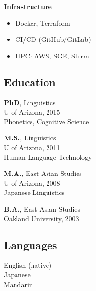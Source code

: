 \documentclass{article}
\begin{document}
\begin{minipage}[t]{0.28\textwidth}
\vspace{0.3em}
\textbf{Infrastructure}
\begin{itemize}[leftmargin=1em, itemsep=0pt, topsep=2pt, parsep=0pt]
  \item Docker, Terraform
  \item CI/CD (GitHub/GitLab)
  \item HPC: AWS, SGE, Slurm
\end{itemize}

\subsection*{Education}
\textbf{PhD}, Linguistics \\
U of Arizona, 2015 \\
{\small Phonetics, Cognitive Science}

\vspace{0.4em}
\textbf{M.S.}, Linguistics \\
U of Arizona, 2011 \\
{\small Human Language Technology}

\vspace{0.4em}
\textbf{M.A.}, East Asian Studies \\
U of Arizona, 2008 \\
{\small Japanese Linguistics}

\vspace{0.4em}
\textbf{B.A.}, East Asian Studies \\
Oakland University, 2003

\subsection*{Languages}
English (native) \\
Japanese \\
Mandarin

\end{minipage}%
\hfill
\vrule
\hfill
\end{document}
